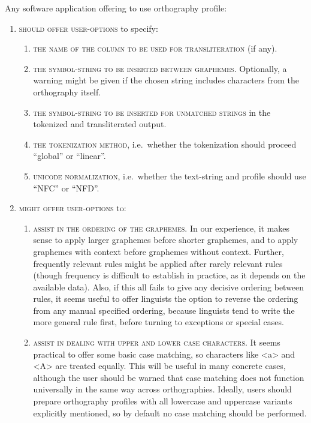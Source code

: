 Any software application offering to use orthography profile:
\begin{enumerate}
	\def\labelenumi{\arabic{enumi}.} 
	\item \textsc{should offer user-options} to specify:
	\begin{enumerate}
		\def\labelenumii{\arabic{enumii}.} 
		\item \textsc{the name of the column to be used for transliteration} (if any). 
		\item \textsc{the symbol-string to be inserted between graphemes.} Optionally, a warning might be given if the chosen string includes characters from the orthography itself. 
		\item \textsc{the symbol-string to be inserted for unmatched strings} in the tokenized and transliterated output. 
		\item \textsc{the tokenization method}, i.e.~whether the tokenization should proceed ``global'' or ``linear''. 
		\item \textsc{unicode normalization}, i.e.~whether the text-string and profile should use ``NFC'' or ``NFD''. 
	\end{enumerate}
	\item \textsc{might offer user-options }to:
	\begin{enumerate}
		\def\labelenumii{\arabic{enumii}.} \setcounter{enumii}{5} 
		\item \textsc{assist in the ordering of the graphemes.} In our experience, it makes sense to apply larger graphemes before shorter graphemes, and to apply graphemes with context before graphemes without context. Further, frequently relevant rules might be applied after rarely relevant rules (though frequency is difficult to establish in practice, as it depends on the available data). Also, if this all fails to give any decisive ordering between rules, it seems useful to offer linguists the option to reverse the ordering from any manual specified ordering, because linguists tend to write the more general rule first, before turning to exceptions or special cases. 
		\item \textsc{assist in dealing with upper and lower case characters.} It seems practical to offer some basic case matching, so characters like <a> and <A> are treated equally. This will be useful in many concrete cases, although the user should be warned that case matching does not function universally in the same way across orthographies. Ideally, users should prepare orthography profiles with all lowercase and uppercase variants explicitly mentioned, so by default no case matching should be performed. 

\end{enumerate}
\end{enumerate}
